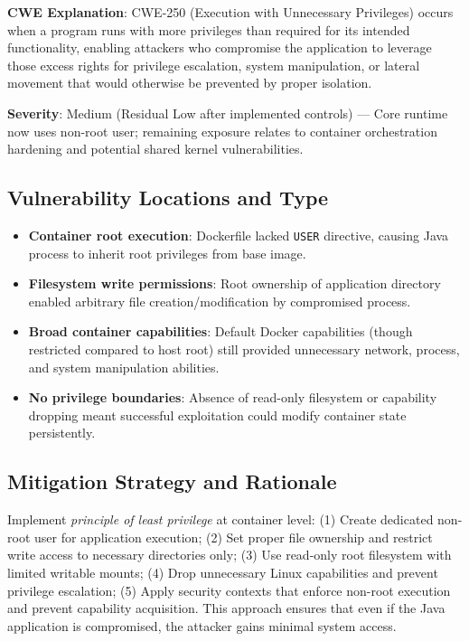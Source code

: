 \documentclass[]{UCD_CS_FYP_Report}
\begin{document}
\textbf{CWE Explanation}: CWE-250 (Execution with Unnecessary Privileges) occurs when a program runs with more privileges than required for its intended functionality, enabling attackers who compromise the application to leverage those excess rights for privilege escalation, system manipulation, or lateral movement that would otherwise be prevented by proper isolation.

\textbf{Severity}: Medium (Residual Low after implemented controls) — Core runtime now uses non-root user; remaining exposure relates to container orchestration hardening and potential shared kernel vulnerabilities.

\subsection*{Vulnerability Locations and Type}
\begin{itemize}
  \item \textbf{Container root execution}: Dockerfile lacked \texttt{USER} directive, causing Java process to inherit root privileges from base image.
  \item \textbf{Filesystem write permissions}: Root ownership of application directory enabled arbitrary file creation/modification by compromised process.
  \item \textbf{Broad container capabilities}: Default Docker capabilities (though restricted compared to host root) still provided unnecessary network, process, and system manipulation abilities.
  \item \textbf{No privilege boundaries}: Absence of read-only filesystem or capability dropping meant successful exploitation could modify container state persistently.
\end{itemize}

\subsection*{Mitigation Strategy and Rationale}
Implement \textit{principle of least privilege} at container level: (1) Create dedicated non-root user for application execution; (2) Set proper file ownership and restrict write access to necessary directories only; (3) Use read-only root filesystem with limited writable mounts; (4) Drop unnecessary Linux capabilities and prevent privilege escalation; (5) Apply security contexts that enforce non-root execution and prevent capability acquisition. This approach ensures that even if the Java application is compromised, the attacker gains minimal system access.
\end{document}
